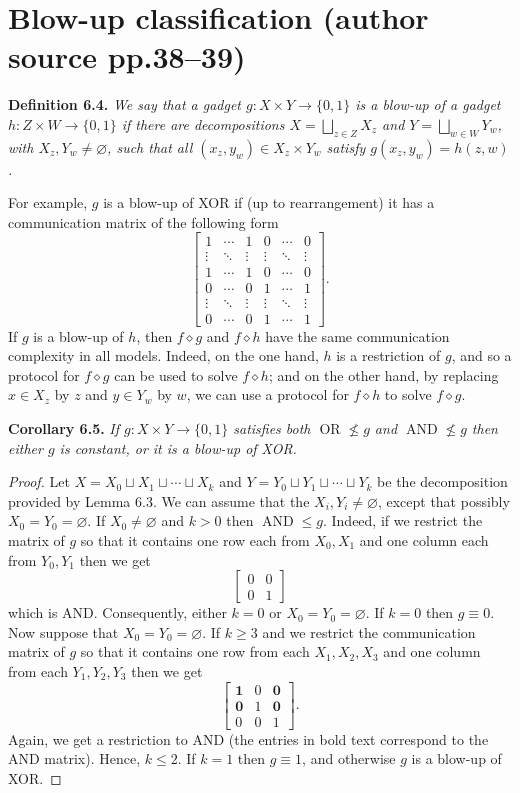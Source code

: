 \documentclass[10pt,a4paper]{article}
\newcommand{\bits}{\{0,1\}}
\newcommand{\comp}{\diamond}
\newcommand{\OR}{\operatorname{OR}}
\newcommand{\AND}{\operatorname{AND}}
\newenvironment{originalresult}[1]{\par\medskip\noindent\textbf{#1.}\itshape}{\par\medskip}
\begin{document}
\section*{Blow-up classification (author source pp.38--39)}
\begin{originalresult}{Definition 6.4}
We say that a gadget $g:X\times Y\to\bits$ is a blow-up of a gadget $h:Z\times W\to\bits$ if there are decompositions $X=\bigsqcup_{z\in Z}X_z$ and $Y=\bigsqcup_{w\in W}Y_w$, with $X_z,Y_w\ne\varnothing$, such that all $(x_z,y_w)\in X_z\times Y_w$ satisfy $g(x_z,y_w)=h(z,w)$.
\end{originalresult}
For example, $g$ is a blow-up of XOR if (up to rearrangement) it has a communication matrix of the following form
\[\begin{bmatrix}1&\cdots&1&0&\cdots&0\\\vdots&\ddots&\vdots&\vdots&\ddots&\vdots\\1&\cdots&1&0&\cdots&0\\0&\cdots&0&1&\cdots&1\\\vdots&\ddots&\vdots&\vdots&\ddots&\vdots\\0&\cdots&0&1&\cdots&1\end{bmatrix}.\]
If $g$ is a blow-up of $h$, then $f\comp g$ and $f\comp h$ have the same communication complexity in all models. Indeed, on the one hand, $h$ is a restriction of $g$, and so a protocol for $f\comp g$ can be used to solve $f\comp h$; and on the other hand, by replacing $x\in X_z$ by $z$ and $y\in Y_w$ by $w$, we can use a protocol for $f\comp h$ to solve $f\comp g$.
\begin{originalresult}{Corollary 6.5}
If $g:X\times Y\to\bits$ satisfies both $\OR\nleq g$ and $\AND\nleq g$ then either $g$ is constant, or it is a blow-up of XOR.
\end{originalresult}
\begin{proof}
Let $X=X_0\sqcup X_1\sqcup\cdots\sqcup X_k$ and $Y=Y_0\sqcup Y_1\sqcup\cdots\sqcup Y_k$ be the decomposition provided by Lemma 6.3. We can assume that the $X_i,Y_i\ne\varnothing$, except that possibly $X_0=Y_0=\varnothing$.
If $X_0\ne\varnothing$ and $k>0$ then $\AND\le g$. Indeed, if we restrict the matrix of $g$ so that it contains one row each from $X_0,X_1$ and one column each from $Y_0,Y_1$ then we get
\[\begin{bmatrix}0&0\\0&1\end{bmatrix}\]
which is AND. Consequently, either $k=0$ or $X_0=Y_0=\varnothing$.
If $k=0$ then $g\equiv0$. Now suppose that $X_0=Y_0=\varnothing$. If $k\ge3$ and we restrict the communication matrix of $g$ so that it contains one row from each $X_1,X_2,X_3$ and one column from each $Y_1,Y_2,Y_3$ then we get
\[\begin{bmatrix}\mathbf1&0&\mathbf0\\\mathbf0&1&\mathbf0\\0&0&1\end{bmatrix}.\]
Again, we get a restriction to AND (the entries in bold text correspond to the AND matrix). Hence, $k\le2$. If $k=1$ then $g\equiv1$, and otherwise $g$ is a blow-up of XOR.
\end{proof}
\end{document}

